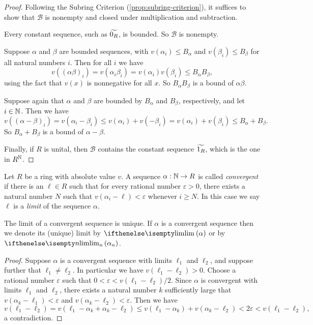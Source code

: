 \begin{proof}
Following the Subring Criterion (\ref{prop:subring-criterion}), it suffices to show that \(\mathcal{B}\) is nonempty and closed under multiplication and subtraction.
\begin{inlineproplist}
\item Every constant sequence, such as \(\widetilde{0_R}\), is bounded.
So \(\mathcal{B}\) is nonempty.
\item Suppose \(\alpha\) and \(\beta\) are bounded sequences, with \(v(\alpha_i) \leq B_\alpha\) and \(v(\beta_i) \leq B_\beta\) for all natural numbers \(i\).
Then for all \(i\) we have  \[ v((\alpha\beta)_i) = v(\alpha_i \beta_i) = v(\alpha_i)v(\beta_i) \leq B_\alpha B_\beta, \] using the fact that \(v(x)\) is nonnegative for all \(x\).
So \(B_\alpha B_\beta\) is a bound of \(\alpha\beta\).
\item Suppose again that \(\alpha\) and \(\beta\) are bounded by \(B_\alpha\) and \(B_\beta\), respectively, and let \(i \in \mathbb{N}\). Then we have \[ v((\alpha - \beta)_i) = v(\alpha_i - \beta_i) \leq v(\alpha_i) + v(-\beta_i) = v(\alpha_i) + v(\beta_i) \leq B_\alpha + B_\beta. \] So \(B_\alpha + B_\beta\) is a bound of \(\alpha - \beta\).
\end{inlineproplist}
Finally, if \(R\) is unital, then \(\mathcal{B}\) contains the constant sequence \(\widetilde{1_R}\), which is the one in \(R^{\mathbb{N}}\).
\end{proof}

\begin{dfn}
Let \(R\) be a ring with absolute value \(v\).
A sequence \(\alpha : \mathbb{N} \rightarrow R\) is called \emph{convergent} if there is an \(\ell \in R\) such that for every rational number \(\varepsilon > 0\), there exists a natural number \(N\) such that \(v(\alpha_i - \ell) < \varepsilon\) whenever \(i \geq N\).
In this case we say \(\ell\) is a \emph{limit} of the sequence \(\alpha\).
\end{dfn}

\begin{prop}
The limit of a convergent sequence is unique.
If \(\alpha\) is a convergent sequence then we denote its (unique) limit by \(\LIM{\alpha}\) or by \(\LIM[n]{\alpha_n}\).
\end{prop}

\begin{proof}
Suppose \(\alpha\) is a convergent sequence with limits \(\ell_1\) and \(\ell_2\), and suppose further that \(\ell_1 \neq \ell_2\).
In particular we have \(v(\ell_1 - \ell_2) > 0\).
Choose a rational number \(\varepsilon\) such that \(0 < \varepsilon < v(\ell_1 - \ell_2)/2\).
Since \(\alpha\) is convergent with limits \(\ell_1\) and \(\ell_2\), there exists a natural number \(k\) sufficiently large that \(v(\alpha_k - \ell_1) < \varepsilon\) and \(v(\alpha_k - \ell_2) < \varepsilon\).
Then we have \[ v(\ell_1 - \ell_2) = v(\ell_1 - \alpha_k + \alpha_k - \ell_2) \leq v(\ell_1 - \alpha_k) + v(\alpha_k - \ell_2) < 2\varepsilon < v(\ell_1 - \ell_2), \] a contradiction.
\end{proof}

